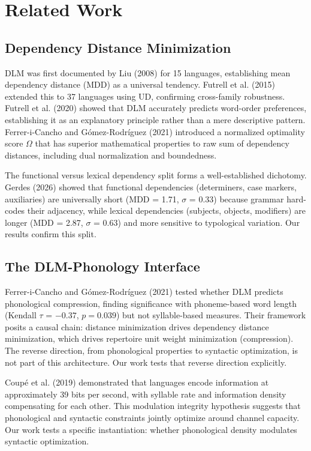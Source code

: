 \documentclass[11pt,letterpaper]{article}
\begin{document}
\section{Related Work}

\subsection{Dependency Distance Minimization}

DLM was first documented by Liu (2008) for 15 languages, establishing mean dependency distance (MDD) as a universal tendency. Futrell et al. (2015) extended this to 37 languages using UD, confirming cross-family robustness. Futrell et al. (2020) showed that DLM accurately predicts word-order preferences, establishing it as an explanatory principle rather than a mere descriptive pattern. Ferrer-i-Cancho and G\'omez-Rodr\'iguez (2021) introduced a normalized optimality score $\Omega$ that has superior mathematical properties to raw sum of dependency distances, including dual normalization and boundedness.

The functional versus lexical dependency split forms a well-established dichotomy. Gerdes (2026) showed that functional dependencies (determiners, case markers, auxiliaries) are universally short (MDD = 1.71, $\sigma$ = 0.33) because grammar hard-codes their adjacency, while lexical dependencies (subjects, objects, modifiers) are longer (MDD = 2.87, $\sigma$ = 0.63) and more sensitive to typological variation. Our results confirm this split.

\subsection{The DLM-Phonology Interface}

Ferrer-i-Cancho and G\'omez-Rodr\'iguez (2021) tested whether DLM predicts phonological compression, finding significance with phoneme-based word length (Kendall $\tau$ = $-0.37$, $p = 0.039$) but not syllable-based measures. Their framework posits a causal chain: distance minimization drives dependency distance minimization, which drives repertoire unit weight minimization (compression). The reverse direction, from phonological properties to syntactic optimization, is not part of this architecture. Our work tests that reverse direction explicitly.

Coup\'e et al. (2019) demonstrated that languages encode information at approximately 39 bits per second, with syllable rate and information density compensating for each other. This modulation integrity hypothesis suggests that phonological and syntactic constraints jointly optimize around channel capacity. Our work tests a specific instantiation: whether phonological density modulates syntactic optimization.
\end{document}
